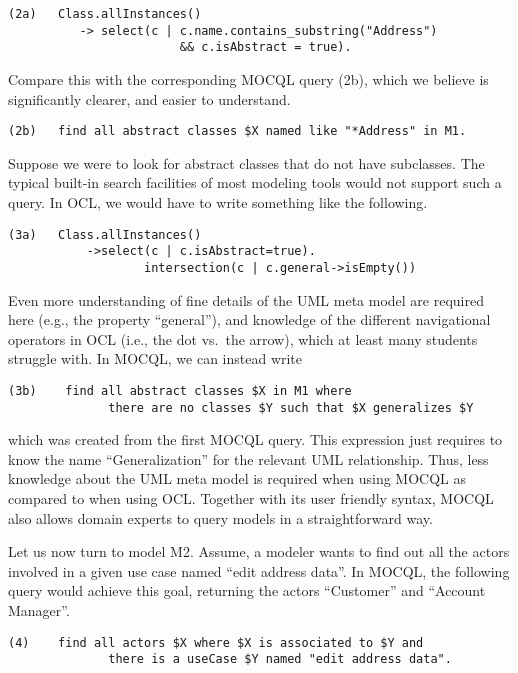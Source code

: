 \documentclass{llncs}
\newcommand{\MMQ}{MOCQL\xspace}
\begin{document}
\begin{verbatim}
(2a)   Class.allInstances()
          -> select(c | c.name.contains_substring("Address") 
                        && c.isAbstract = true).
\end{verbatim}

\noindent Compare this with the corresponding \MMQ query (2b), which we believe is significantly clearer, and easier to understand.

\begin{verbatim}
(2b)   find all abstract classes $X named like "*Address" in M1.
\end{verbatim}

Suppose we were to look for abstract classes that do not have subclasses. The typical built-in search facilities of most modeling tools would not support such a query. In OCL, we would have to write something like the following.

\begin{verbatim}
(3a)   Class.allInstances()
           ->select(c | c.isAbstract=true).
                   intersection(c | c.general->isEmpty())
\end{verbatim}

\noindent Even more understanding of fine details of the UML meta model are required here (e.g., the property ``general''), and knowledge of the different navigational operators in OCL (i.e., the dot vs.\ the arrow), which at least many students struggle with. In \MMQ, we can instead write

\begin{verbatim}
(3b)    find all abstract classes $X in M1 where
              there are no classes $Y such that $X generalizes $Y
\end{verbatim}

\noindent which was created from the first \MMQ query. This expression just requires to know the name ``Generalization'' for the relevant UML relationship. Thus, less knowledge about the UML meta model is required when using \MMQ as compared to when using OCL. Together with its user friendly syntax, \MMQ also allows domain experts to query models in a straightforward way. 

Let us now turn to model M2. Assume, a modeler wants to find out all the actors involved in a given use case named ``edit address data''. In \MMQ, the following query would achieve this goal, returning the actors ``Customer'' and ``Account Manager''.

\begin{verbatim}
(4)    find all actors $X where $X is associated to $Y and 
              there is a useCase $Y named "edit address data".
\end{verbatim}
\end{document}
